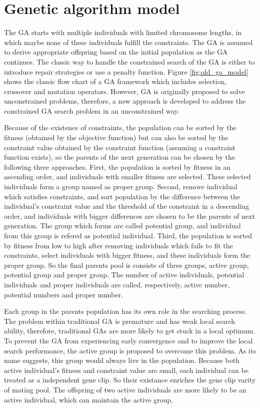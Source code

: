 \section{Genetic algorithm model}



The GA starts with multiple individuals with limited chromosome lengths, in
which maybe none of these individuals fulfill the constraints. The GA is
assumed to derive appropriate offspring based on the initial population as the
GA continues. The classic way to handle the constrained search of the GA is
either to introduce repair strategies or use a penalty function. Figure
\ref{fig:old_ga_model} shows the classic flow chart of a GA framework which
includes selection, crossover and mutation operators. However, GA is originally
proposed to solve unconstrained problems, therefore, a new approach is
developed to address the constrained GA search problem in an unconstrained way. 

Because of the existence of constraints, the population can be sorted by the
fitness (obtained by the objective function) but can also be sorted by the
constraint value obtained by the constraint function (assuming a constraint
function exists), so the parents of the next generation can be chosen by the
following three approaches. First, the population is sorted by fitness in an
ascending order, and individuals with smaller fitness are selected. These
selected individuals form a group named as proper group. Second, remove
individual which satisfies constraints, and sort population  by the difference
between the individual's constraint value and the threshold of the constraint
in a descending order, and individuals with bigger differences are chosen to be
the parents of next generation. The group which forms are called potential
group, and individual from this group is refered as  potential individual.
Third, the population is sorted by fitness from low to high after removing
individuals which fails to fit the constraints, select individuals with bigger
fitness, and these individuals form the proper group.  So the final parents
pool is consists of three groups, active group, potential group and proper
group.  The number of active individuals, potential individuals and proper
individuals are called, respectively, active number, potential numbers and
proper number. 

Each group in the parents population has its own role in the searching
process.  The problem within traditional GA is premature and has weak local
search ability, therefore, traditional GAs are more likely to get stuck in a
local optimum. To prevent the GA from experiencing early convergence and to
improve the local search performance, the active group is proposed to overcome
this problem. As its name suggests, this group would always live in the
population.  Because both active individual's fitness and constraint value are small,
each individual can be treated as a independent gene clip. So their existance
enriches the gene clip varity of mating pool. The offspring of two active
individuals are more likely to be an active individual, which can maintain the
active group.

